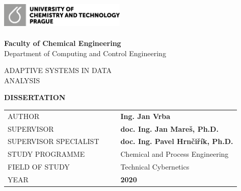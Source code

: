 \cleardoublepage
\thispagestyle{empty}
\thispagestyle{empty}
\noindent
\includegraphics[width=0.45\textwidth]{IMG/TOP/logoUCT_basic_CB.png} \\
\vspace{10mm}
\\
{\Large \textbf{Faculty of Chemical Engineering}
\\ [5mm]
Department of Computing and Control Engineering}

\vspace{40mm}

\begin{spacing}{0.9}
\Huge\noindent ADAPTIVE SYSTEMS IN DATA \\ANALYSIS\\
\end{spacing}

\vspace{30mm}

\noindent
{\Large \textbf{DISSERTATION}} 

\vspace{15mm}

\begin{table}[!h]
\begin{tabular}{  l l |l  l }
\hspace{-0.5em}AUTHOR & \hspace{0mm} & & {\Large \textbf{Ing. Jan Vrba}} \\ [7mm]
\hspace{-0.5em}SUPERVISOR &  &  & \textbf{\large doc. Ing. Jan Mareš, Ph.D.}\\ [7mm]
\hspace{-0.5em}SUPERVISOR SPECIALIST    &     &   & {\textbf{\large doc. Ing. Pavel Hrnčiřík, Ph.D.}} \\ [7mm]
\hspace{-0.5em}STUDY PROGRAMME &  &  & {\large Chemical and Process Engineering} \\ [7mm]
\hspace{-0.5em}FIELD OF STUDY & &   & {\large Technical Cybernetics}\\ [7mm]
\hspace{-0.5em}YEAR          &       &   & \textbf{2020} \\
\end{tabular}


\end{table}

